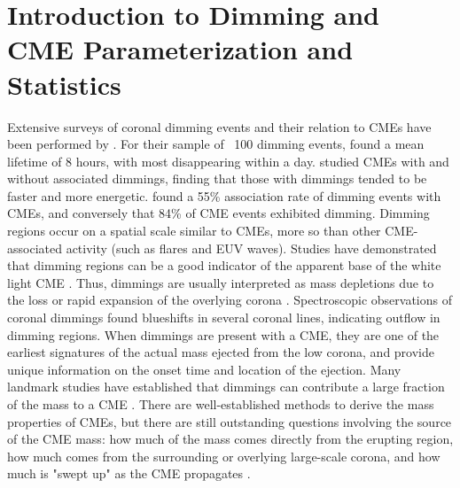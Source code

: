 \section{Introduction to Dimming and CME Parameterization and Statistics}
Extensive surveys of coronal dimming events and their relation to CMEs have been performed by \citet{Reinard2008, Reinard2009}. For their sample of ~100 dimming events, \citet{Reinard2008} found a mean lifetime of 8 hours, with most disappearing within a day. \citet{Reinard2009} studied CMEs with and without associated dimmings, finding that those with dimmings tended to be faster and more energetic. \citet{Bewsher2008} found a 55\% association rate of dimming events with CMEs, and conversely that 84\% of CME events exhibited dimming. Dimming regions occur on a spatial scale similar to CMEs, more so than other CME-associated activity (such as flares and EUV waves). Studies have demonstrated that dimming regions can be a good indicator of the apparent base of the white light CME \citep{Thompson2000, Harrison2003, Zhukov2004}. Thus, dimmings are usually interpreted as mass depletions due to the loss or rapid expansion of the overlying corona \citep{Hudson1998, Harrison2000, Zhukov2004}. Spectroscopic observations of coronal dimmings \citep{Harra2001, Harrison2003, Harra2001} found blueshifts in several coronal lines, indicating outflow in dimming regions. When dimmings are present with a CME, they are one of the earliest signatures of the actual mass ejected from the low corona, and provide unique information on the onset time and location of the ejection. Many landmark studies have established that dimmings can contribute a large fraction of the mass to a CME \citep{Harrison2000, Harrison2003, Zhukov2004, Aschwanden2009}. There are well-established methods to derive the mass properties of CMEs, but there are still outstanding questions involving the source of the CME mass: how much of the mass comes directly from the erupting region, how much comes from the surrounding or overlying large-scale corona, and how much is "swept up" as the CME propagates \citep{Bein2013}.


